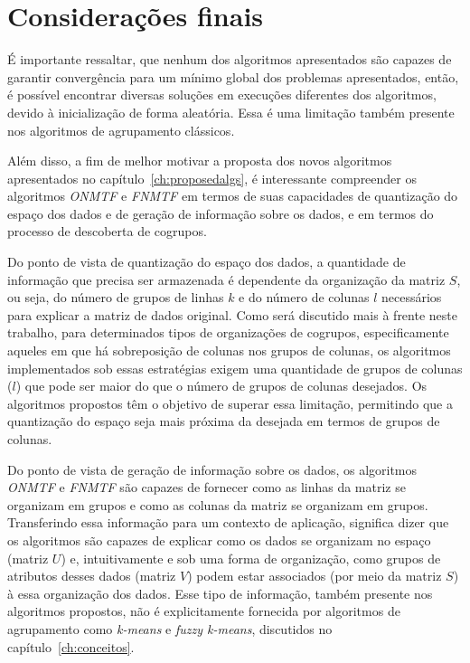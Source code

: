 \documentclass[
    12pt,                %
    oneside,            %
    a4paper,            %
    english,            %
    brazil                %
    ]{abntex2ppgsi}
\begin{document}

\section{Considerações finais}


É importante ressaltar, que nenhum dos algoritmos apresentados são capazes de garantir convergência para um mínimo global dos problemas apresentados, então, é possível encontrar diversas soluções em execuções diferentes dos algoritmos, devido à inicialização de forma aleatória.
Essa é uma limitação também presente nos algoritmos de agrupamento clássicos.

Além disso, a fim de melhor motivar a proposta dos novos algoritmos apresentados no capítulo~\ref{ch:proposedalgs}, é interessante compreender os algoritmos \textit{ONMTF} e \textit{FNMTF} em termos de suas capacidades de quantização do espaço dos dados e de geração de informação sobre os dados, e em termos do processo de descoberta de cogrupos.

Do ponto de vista de quantização do espaço dos dados, a quantidade de informação que precisa ser armazenada é dependente da organização da matriz $S$, ou seja, do número de grupos de linhas $k$ e do número de colunas $l$ necessários para explicar a matriz de dados original.
Como será discutido mais à frente neste trabalho, para determinados tipos de organizações de cogrupos, especificamente aqueles em que há sobreposição de colunas nos grupos de colunas, os algoritmos implementados sob essas estratégias exigem uma quantidade de grupos de colunas ($l$) que pode ser maior do que o número de grupos de colunas desejados.
Os algoritmos propostos têm o objetivo de superar essa limitação, permitindo que a quantização do espaço seja mais próxima da desejada em termos de grupos de colunas.

Do ponto de vista de geração de informação sobre os dados, os algoritmos \textit{ONMTF} e \textit{FNMTF} são capazes de fornecer como as linhas da matriz se organizam em grupos e como as colunas da matriz se organizam em grupos.
Transferindo essa informação para um contexto de aplicação, significa dizer que os algoritmos são capazes de explicar como os dados se organizam no espaço (matriz $U$) e, intuitivamente e sob uma forma de organização, como grupos de atributos desses dados (matriz $V$) podem estar associados (por meio da matriz $S$) à essa organização dos dados.
Esse tipo de informação, também presente nos algoritmos propostos, não é explicitamente fornecida por algoritmos de agrupamento como \textit{k-means} e \textit{fuzzy k-means}, discutidos no capítulo~\ref{ch:conceitos}.
\end{document}
